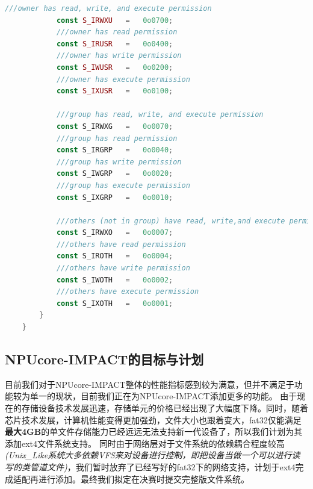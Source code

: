 \begin{lstlisting}[language={rust}, label={code:refill}, caption={FileDescriptor}]
            ///owner has read, write, and execute permission
            const S_IRWXU   =   0o0700;
            ///owner has read permission
            const S_IRUSR   =   0o0400;
            ///owner has write permission
            const S_IWUSR   =   0o0200;
            ///owner has execute permission
            const S_IXUSR   =   0o0100;

            ///group has read, write, and execute permission
            const S_IRWXG   =   0o0070;
            ///group has read permission
            const S_IRGRP   =   0o0040;
            ///group has write permission
            const S_IWGRP   =   0o0020;
            ///group has execute permission
            const S_IXGRP   =   0o0010;

            ///others (not in group) have read, write,and execute permission
            const S_IRWXO   =   0o0007;
            ///others have read permission
            const S_IROTH   =   0o0004;
            ///others have write permission
            const S_IWOTH   =   0o0002;
            ///others have execute permission
            const S_IXOTH   =   0o0001;
        }
    }
\end{lstlisting}

\subsection{NPUcore-IMPACT的目标与计划}

目前我们对于NPUcore-IMPACT整体的性能指标感到较为满意，但并不满足于功能较为单一的现状，目前我们正在为NPUcore-IMPACT添加更多的功能。
由于现在的存储设备技术发展迅速，存储单元的价格已经出现了大幅度下降。同时，随着芯片技术发展，计算机性能变得更加强劲，文件大小也跟着变大，fat32仅能满足\textbf{最大4GB}的单文件存储能力已经远远无法支持新一代设备了，所以我们计划为其添加ext4文件系统支持。
同时由于网络层对于文件系统的依赖耦合程度较高\textit{(Unix_Like系统大多依赖VFS来对设备进行控制，即把设备当做一个可以进行读写的类管道文件)}，我们暂时放弃了已经写好的fat32下的网络支持，计划于ext4完成适配再进行添加。最终我们拟定在决赛时提交完整版文件系统。